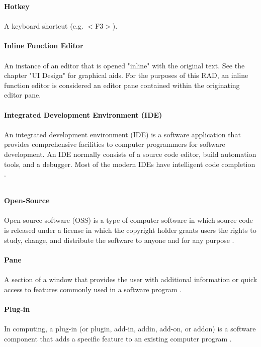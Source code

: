 \documentclass[]{report}
\begin{document}
	\noindent\textbf{Hotkey}\\ \\
	A keyboard shortcut (e.g. $<$F3$>$).\\ \\
	
	\noindent\textbf{Inline Function Editor}\\ \\
	An instance of an editor that is opened "inline" with the original text.  See the chapter "UI Design" for graphical aids.  For the purposes of this RAD, an inline function editor is considered an editor pane contained within the originating editor pane.\\ \\

	\noindent\textbf{Integrated Development Environment (IDE)}\\ \\
	An integrated development environment (IDE) is a software application that provides comprehensive facilities to computer programmers for software development. An IDE normally consists of a source code editor, build automation tools, and a debugger. Most of the modern IDEs have intelligent code completion \citep{ideWiki}.\\ \\
	
	\newpage
	
	\noindent\textbf{Open-Source}\\ \\
	Open-source software (OSS) is a type of computer software in which source code is released under a license in which the copyright holder grants users the rights to study, change, and distribute the software to anyone and for any purpose \citep{oss}.\\ \\
	
	\noindent\textbf{Pane}\\ \\
	A section of a window that provides the user with additional information or quick access to features commonly used in a software program \citep{pane}.\\ \\
	
	\noindent\textbf{Plug-in}\\ \\
	In computing, a plug-in (or plugin, add-in, addin, add-on, or addon) is a software component that adds a specific feature to an existing computer program \citep{plugIn}. \\ \\


\raggedright

\end{document}
